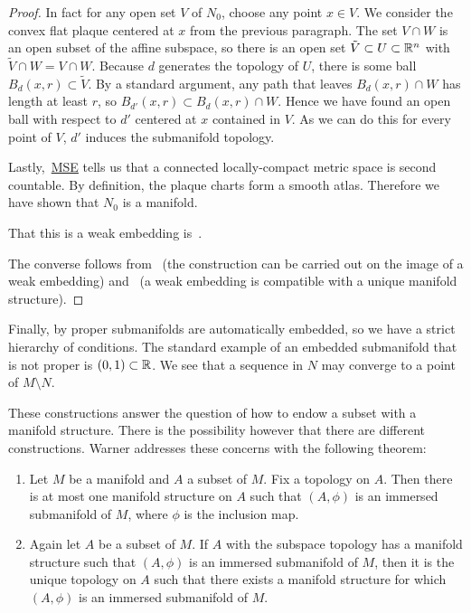 \begin{proof}
In fact for any open set $V$ of $N_0$, choose any point $x \in V$.
We consider the convex flat plaque centered at $x$ from the previous paragraph.
The set $V \cap W$ is an open subset of the affine subspace, so there is an open set $\tilde{V} \subset U \subset \mathbb{R}^n$ with $\tilde{V} \cap W = V \cap W$.
Because $d$ generates the topology of $U$, there is some ball $B_d(x,r) \subset \tilde{V}$.
By a standard argument, any path that leaves $B_d(x,r) \cap W$ has length at least $r$, so $B_{d'}(x,r) \subset B_d(x,r) \cap W$. 
Hence we have found an open ball with respect to $d'$ centered at $x$ contained in $V$.
As we can do this for every point of $V$, $d'$ induces the submanifold topology.

Lastly,~\href{https://math.stackexchange.com/questions/10885/non-separable-locally-compact-connected-metric-space}{MSE} tells us that a connected locally-compact metric space is second countable.
By definition, the plaque charts form a smooth atlas.
Therefore we have shown that $N_0$ is a manifold.

That this is a weak embedding is~\cite[Thm~1.2.7(iii)]{Kolar1993}.

The converse follows from~\cite[I.2.15~Lemma]{Kolar1993} (the construction can be carried out on the image of a weak embedding) and~\cite[Lemma~1.1.41]{Sharpe1997} (a weak embedding is compatible with a unique manifold structure).
\end{proof}

Finally, by \cite[Thm~1.2.11]{Sharpe1997} proper submanifolds are automatically embedded, so we have a strict hierarchy of conditions.
The standard example of an embedded submanifold that is not proper is $(0,1) \subset \mathbb{R}$.
We see that a sequence in $N$ may converge to a point of $M\setminus N$.

These constructions answer the question of how to endow a subset with a manifold structure.
There is the possibility however that there are different constructions.
Warner addresses these concerns with the following theorem: 
\begin{theorem}
\label{thm:submanifolds}
\textup{\cite[Remark~1.33]{Warner1983}}
\begin{enumerate}
\item Let $M$ be a manifold and $A$ a subset of $M$. Fix a topology on $A$. Then there is at most one manifold structure on $A$ such that $(A,\phi)$ is an immersed submanifold of $M$, where $\phi$ is the inclusion map.
\item Again let $A$ be a subset of $M$. If $A$ with the subspace topology has a manifold structure such that $(A,\phi)$ is an immersed submanifold of $M$, then it is the unique topology on $A$ such that there exists a manifold structure for which $(A,\phi)$ is an immersed submanifold of $M$.
\end{enumerate}
\end{theorem}

